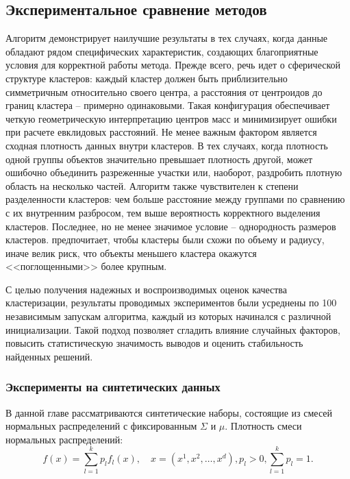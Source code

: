     \subsection{Экспериментальное сравнение методов}
        Алгоритм \kmeans{} демонстрирует наилучшие результаты в тех случаях, когда данные обладают рядом специфических характеристик, создающих благоприятные условия для корректной работы метода. Прежде всего, речь идет о сферической структуре кластеров: каждый кластер должен быть приблизительно симметричным относительно своего центра, а расстояния от центроидов до границ кластера -- примерно одинаковыми. Такая конфигурация обеспечивает четкую геометрическую интерпретацию центров масс и минимизирует ошибки при расчете евклидовых расстояний.
        Не менее важным фактором является сходная плотность данных внутри кластеров. В тех случаях, когда плотность одной группы объектов значительно превышает плотность другой, \kmeans{} может ошибочно объединить разреженные участки или, наоборот, раздробить плотную область на несколько частей. Алгоритм также чувствителен к степени разделенности кластеров: чем больше расстояние между группами по сравнению с их внутренним разбросом, тем выше вероятность корректного выделения кластеров.
        Последнее, но не менее значимое условие -- однородность размеров кластеров. \kmeans{} предпочитает, чтобы кластеры были схожи по объему и радиусу, иначе велик риск, что объекты меньшего кластера окажутся <<поглощенными>> более крупным.

        С целью получения надежных и воспроизводимых оценок качества кластеризации, результаты проводимых экспериментов были усреднены по 100 независимым запускам алгоритма, каждый из которых начинался с различной инициализации. Такой подход позволяет сгладить влияние случайных факторов, повысить статистическую значимость выводов и оценить стабильность найденных решений.


        \subsubsection{Эксперименты на синтетических данных}

            В данной главе рассматриваются синтетические наборы, состоящие из смесей нормальных распределений с фиксированным \(\Sigma\) и \(\mu\). Плотность смеси нормальных распределений:
            \begin{equation*}
                f(x) = \sum_{l=1}^k p_lf_l(x), \quad x=(x^1,x^2, \dots,x^d),  p_l>0, \sum_{l=1}^{k}p_l=1.
            \end{equation*}

